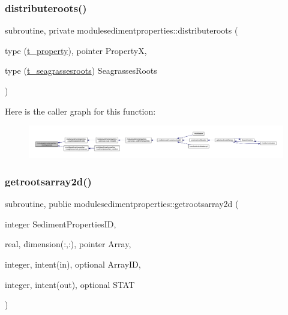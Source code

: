 \subsubsection{\texorpdfstring{distributeroots()}{distributeroots()}}
{\footnotesize\ttfamily subroutine, private modulesedimentproperties\+::distributeroots (\begin{DoxyParamCaption}\item[{type (\mbox{\hyperlink{structmodulesedimentproperties_1_1t__property}{t\+\_\+property}}), pointer}]{PropertyX,  }\item[{type (\mbox{\hyperlink{structmodulesedimentproperties_1_1t__seagrassesroots}{t\+\_\+seagrassesroots}})}]{Seagrasses\+Roots }\end{DoxyParamCaption})\hspace{0.3cm}{\ttfamily [private]}}

Here is the caller graph for this function\+:\nopagebreak
\begin{figure}[H]
\begin{center}
\leavevmode
\includegraphics[width=350pt]{namespacemodulesedimentproperties_ab83ce67b0749c96200f2b82879c0b349_icgraph}
\end{center}
\end{figure}
\mbox{\label{namespacemodulesedimentproperties_a36fdb0ce96392baedfac23a2a327bf82}} 
\subsubsection{\texorpdfstring{getrootsarray2d()}{getrootsarray2d()}}
{\footnotesize\ttfamily subroutine, public modulesedimentproperties\+::getrootsarray2d (\begin{DoxyParamCaption}\item[{integer}]{Sediment\+Properties\+ID,  }\item[{real, dimension(\+:,\+:), pointer}]{Array,  }\item[{integer, intent(in), optional}]{Array\+ID,  }\item[{integer, intent(out), optional}]{S\+T\+AT }\end{DoxyParamCaption})}

